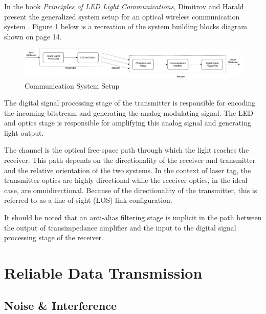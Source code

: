 In the book \textit{Principles of LED Light Communications}, Dimitrov and Harald present the generalized system setup for an optical wireless communication system \cite{Dimitrov2015}. Figure \ref{fig:system_configuartion_lit} below is a recreation of the system building blocks diagram shown on page 14.

\begin{figure}[H]
	\centering
	\includegraphics[width=\linewidth]{figures/litreview/system_configuartion_lit.png}
	\caption{Communication System Setup}
	\label{fig:system_configuartion_lit}
\end{figure}

The digital signal processing stage of the transmitter is responsible for encoding the incoming bitstream and generating the analog modulating signal. The LED and optics stage is responsible for amplifying this analog signal and generating light output.

The channel is the optical free-space path through which the light reaches the receiver. This path depends on the directionality of the receiver and transmitter and the relative orientation of the two systems. In the context of laser tag, the transmitter optics are highly directional while the receiver optics, in the ideal case, are omnidirectional. Because of the directionality of the transmitter, this is referred to as a line of sight (LOS) link configuration.

It should be noted that an anti-alias filtering stage is implicit in the path between the output of transimpedance amplifier and the input to the digital signal processing stage of the receiver.



\section{Reliable Data Transmission}

\subsection{Noise \& Interference}

